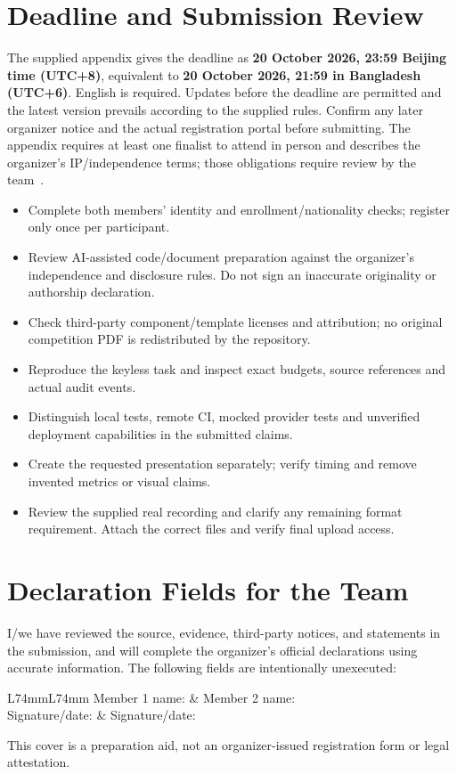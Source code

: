 \documentclass[conference,onecolumn,a4paper]{IEEEtran}
\begin{document}
\section{Deadline and Submission Review}
The supplied appendix gives the deadline as \textbf{20 October 2026, 23:59 Beijing time (UTC+8)}, equivalent to \textbf{20 October 2026, 21:59 in Bangladesh (UTC+6)}. English is required. Updates before the deadline are permitted and the latest version prevails according to the supplied rules. Confirm any later organizer notice and the actual registration portal before submitting. The appendix requires at least one finalist to attend in person and describes the organizer's IP/independence terms; those obligations require review by the team~\cite{competition}.

\begin{itemize}
\item[$\square$] Complete both members' identity and enrollment/nationality checks; register only once per participant.
\item[$\square$] Review AI-assisted code/document preparation against the organizer's independence and disclosure rules. Do not sign an inaccurate originality or authorship declaration.
\item[$\square$] Check third-party component/template licenses and attribution; no original competition PDF is redistributed by the repository.
\item[$\square$] Reproduce the keyless task and inspect exact budgets, source references and actual audit events.
\item[$\square$] Distinguish local tests, remote CI, mocked provider tests and unverified deployment capabilities in the submitted claims.
\item[$\square$] Create the requested presentation separately; verify timing and remove invented metrics or visual claims.
\item[$\square$] Review the supplied real recording and clarify any remaining format requirement. Attach the correct files and verify final upload access.
\end{itemize}

\section{Declaration Fields for the Team}
I/we have reviewed the source, evidence, third-party notices, and statements in the submission, and will complete the organizer's official declarations using accurate information. The following fields are intentionally unexecuted:
\begin{center}
\begin{tabular}{L{74mm}L{74mm}}
Member 1 name: \field{42mm} & Member 2 name: \field{42mm}\\[5mm]
Signature/date: \field{45mm} & Signature/date: \field{45mm}
\end{tabular}
\end{center}
This cover is a preparation aid, not an organizer-issued registration form or legal attestation.



\end{document}
